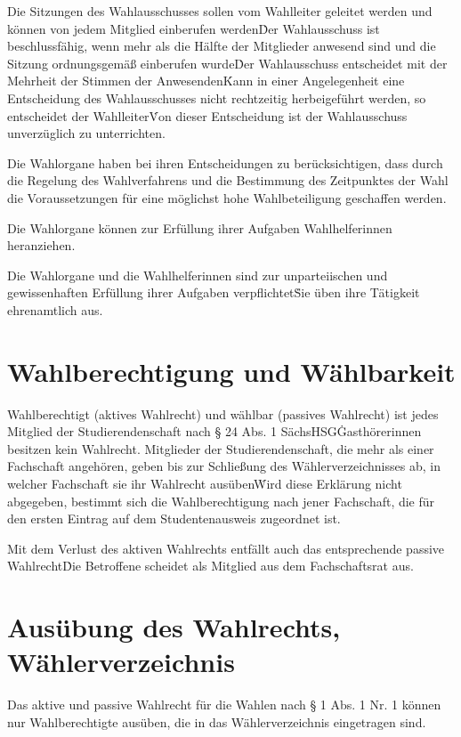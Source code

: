 \begin{multicols}{2}
\Abs \Satz Die Sitzungen des Wahlausschusses sollen vom Wahlleiter geleitet werden und können von jedem Mitglied einberufen werden\. Der Wahlausschuss ist beschlussfähig, wenn mehr als die Hälfte der Mitglieder anwesend sind und die Sitzung ordnungsgemäß einberufen wurde\. Der Wahlausschuss entscheidet mit der Mehrheit der Stimmen der Anwesenden\. Kann in einer Angelegenheit eine Entscheidung des Wahlausschusses nicht rechtzeitig herbeigeführt werden, so entscheidet der Wahlleiter\. Von dieser Entscheidung ist der Wahlausschuss unverzüglich zu unterrichten.

\Abs \Satz Die Wahlorgane haben bei ihren Entscheidungen zu berücksichtigen, dass durch die Regelung des Wahlverfahrens und die Bestimmung des Zeitpunktes der Wahl die Voraussetzungen für eine möglichst hohe Wahlbeteiligung geschaffen werden.

\Abs \Satz Die Wahlorgane können zur Erfüllung ihrer Aufgaben Wahlhelferinnen heranziehen.

\Abs \Satz Die Wahlorgane und die Wahlhelferinnen sind zur unparteiischen und gewissenhaften Erfüllung ihrer Aufgaben verpflichtet\. Sie üben ihre Tätigkeit ehrenamtlich aus.

\section{Wahlberechtigung und Wählbarkeit}
\Abs \Satz Wahlberechtigt (aktives Wahlrecht) und wählbar (passives Wahlrecht) ist jedes Mitglied der Studierendenschaft nach § 24 Abs. 1 SächsHSG\. Gasthörerinnen besitzen kein Wahlrecht.
\newpage %
\Abs \Satz Mitglieder der Studierendenschaft, die mehr als einer Fachschaft angehören, geben bis zur Schließung des Wählerverzeichnisses ab, in welcher Fachschaft sie ihr Wahlrecht ausüben\. Wird diese Erklärung nicht abgegeben, bestimmt sich die Wahlberechtigung nach jener Fachschaft, die für den ersten Eintrag auf dem Studentenausweis zugeordnet ist.

\Abs \Satz Mit dem Verlust des aktiven Wahlrechts entfällt auch das entsprechende passive Wahlrecht\. Die Betroffene scheidet als Mitglied aus dem Fachschaftsrat aus.

\section{Ausübung des Wahlrechts, Wählerverzeichnis}
\Abs \Satz Das aktive und passive Wahlrecht für die Wahlen nach § 1 Abs. 1 Nr. 1 können nur Wahlberechtigte ausüben, die in das Wählerverzeichnis eingetragen sind.


\end{multicols}
